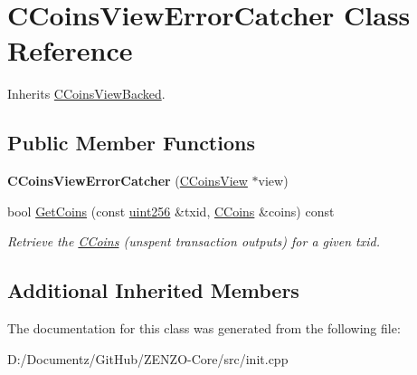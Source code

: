 \hypertarget{class_c_coins_view_error_catcher}{}\section{C\+Coins\+View\+Error\+Catcher Class Reference}
\label{class_c_coins_view_error_catcher}


Inherits \mbox{\hyperlink{class_c_coins_view_backed}{C\+Coins\+View\+Backed}}.

\subsection*{Public Member Functions}
\begin{DoxyCompactItemize}
\item 
\mbox{\label{class_c_coins_view_error_catcher_aa8295e2f5ce5ad9880c5bd86d52e014c}} 
{\bfseries C\+Coins\+View\+Error\+Catcher} (\mbox{\hyperlink{class_c_coins_view}{C\+Coins\+View}} $\ast$view)
\item 
\mbox{\label{class_c_coins_view_error_catcher_a909f7b9e364b6f06bfea955209aa015d}} 
bool \mbox{\hyperlink{class_c_coins_view_error_catcher_a909f7b9e364b6f06bfea955209aa015d}{Get\+Coins}} (const \mbox{\hyperlink{classuint256}{uint256}} \&txid, \mbox{\hyperlink{class_c_coins}{C\+Coins}} \&coins) const
\begin{DoxyCompactList}\small\item\em Retrieve the \mbox{\hyperlink{class_c_coins}{C\+Coins}} (unspent transaction outputs) for a given txid. \end{DoxyCompactList}\end{DoxyCompactItemize}
\subsection*{Additional Inherited Members}


The documentation for this class was generated from the following file\+:\begin{DoxyCompactItemize}
\item 
D\+:/\+Documentz/\+Git\+Hub/\+Z\+E\+N\+Z\+O-\/\+Core/src/init.\+cpp\end{DoxyCompactItemize}
